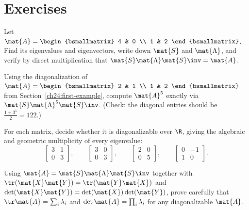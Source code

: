 \section*{Exercises}

\begin{exercise}
\label{ch24:ex-warmup}
Let $\mat{A} = \begin{bsmallmatrix} 4 & 0 \\ 1 & 2 \end{bsmallmatrix}$. Find its
eigenvalues and eigenvectors, write down $\mat{S}$ and $\mat{\Lambda}$, and verify
by direct multiplication that $\mat{S}\mat{\Lambda}\mat{S}\inv = \mat{A}$.
\end{exercise}

\begin{exercise}[A power]
\label{ch24:ex-power}
Using the diagonalization of $\mat{A} = \begin{bsmallmatrix} 2 & 1 \\ 1 & 2
\end{bsmallmatrix}$ from Section~\ref{ch24:first-example}, compute $\mat{A}^5$
exactly via $\mat{S}\mat{\Lambda}^5\mat{S}\inv$. (Check: the diagonal entries
should be $\tfrac{1+3^5}{2} = 122$.)
\end{exercise}

\begin{exercise}
\label{ch24:ex-defective}
For each matrix, decide whether it is diagonalizable over $\R$, giving the
algebraic and geometric multiplicity of every eigenvalue:
\[
  \begin{bmatrix} 3 & 1 \\ 0 & 3 \end{bmatrix},
  \qquad
  \begin{bmatrix} 3 & 0 \\ 0 & 3 \end{bmatrix},
  \qquad
  \begin{bmatrix} 2 & 0 \\ 0 & 5 \end{bmatrix},
  \qquad
  \begin{bmatrix} 0 & -1 \\ 1 & 0 \end{bmatrix}.
\]
\end{exercise}

\begin{exercise}
\label{ch24:ex-tracedet}
Using $\mat{A} = \mat{S}\mat{\Lambda}\mat{S}\inv$ together with
$\tr(\mat{X}\mat{Y}) = \tr(\mat{Y}\mat{X})$ and $\det(\mat{X}\mat{Y}) =
\det(\mat{X})\det(\mat{Y})$, prove carefully that $\tr\mat{A} = \sum_i\lambda_i$
and $\det\mat{A} = \prod_i\lambda_i$ for any diagonalizable $\mat{A}$.
\end{exercise}

